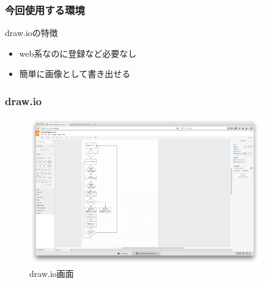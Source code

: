 \documentclass[10pt, dvipdfmx]{beamer}
\begin{document}
        \begin{frame}
            \frametitle{今回使用する環境}
            \begin{block}{draw.ioの特徴}
                \begin{itemize}
                    \item web系なのに登録など必要なし
                    \item 簡単に画像として書き出せる
                \end{itemize}
            \end{block}
        \end{frame}

        \begin{frame}
            \frametitle{draw.io}
                \begin{figure}[htb]
                    \includegraphics[width=100mm]{images/drawIO.png}
                    \caption{draw.io画面}
                    \label{fig:04}
                \end{figure}
        \end{frame}
\end{document}
